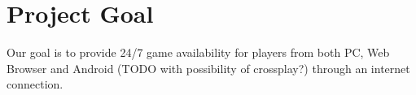 \section{Project Goal}

Our goal is to provide 24/7 game availability for players from both PC, Web Browser and Android (TODO with possibility of crossplay?) through an internet connection.